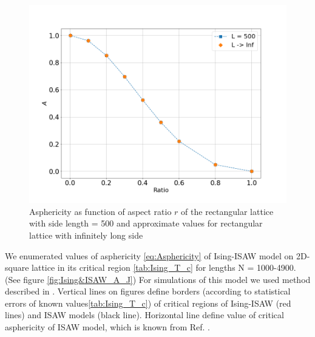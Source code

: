 \documentclass[aps,pre,amssymb,amsmath,twocolumn,floatfix]{revtex4-2}
\begin{document}
\begin{figure}[h]
    \centering
    \includegraphics[width=\columnwidth]{Images/A_r.png}
    \caption{Asphericity as function of aspect ratio $r$ of the rectangular lattice with side length = 500 and approximate values for rectangular lattice with infinitely long side}
    \label{fig:A_r}
\end{figure}


We enumerated values of asphericity \eqref{eq:Asphericity} of Ising-ISAW model on 2D-square lattice in its critical region \ref{tab:Ising_T_c} for lengths N = 1000-4900. (See figure \ref{fig:Ising&ISAW_A_J}) For simulations of this model we used method described in \cite{faizullina2021critical}. Vertical lines on figures define borders (according to statistical errors of known values\ref{tab:Ising_T_c}) of critical regions of Ising-ISAW (red lines) and ISAW models (black line). Horizontal line define value of critical asphericity of ISAW model, which is known from Ref. \cite{Caracciolo_2011}. 
\end{document}
